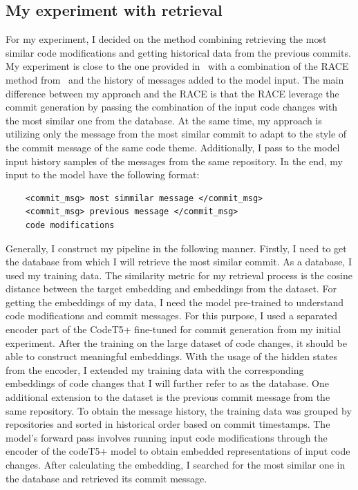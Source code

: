 \subsection{My experiment with retrieval}\label{subsec:retrieval_arch_method}
For my experiment, I decided on the method combining retrieving the most similar code modifications and getting historical data from the previous commits. My experiment is close to the one provided in~\cite{eliseeva2023commit} with a combination of the RACE method from~\cite{shi2022race} and the history of messages added to the model input. The main difference between my approach and the RACE  is that the RACE leverage the commit generation by passing the combination of the input code changes with the most similar one from the database. At the same time, my approach is utilizing only the message from the most similar commit to adapt to the style of the commit message of the same code theme.  Additionally, I pass to the model input history samples of the messages from the same repository. In the end, my input to the model have the following format:  
\begin{verbatim}
    <commit_msg> most simmilar message </commit_msg> 
    <commit_msg> previous message </commit_msg>
    code modifications 
\end{verbatim}
Generally, I construct my pipeline in the following manner. Firstly, I need to get the database from which I will retrieve the most similar commit. As a database, I used my training data. The similarity metric for my retrieval process is the cosine distance between the target embedding and embeddings from the dataset. For getting the embeddings of my data, I need the model pre-trained to understand code modifications and commit messages. For this purpose, I used a separated encoder part of the CodeT5+ fine-tuned for commit generation from my initial experiment. After the training on the large dataset of code changes, it should be able to construct meaningful embeddings. With the usage of the hidden states from the encoder, I extended my training data with the corresponding embeddings of code changes that I will further refer to as the database. One additional extension to the dataset is the previous commit message from the same repository. To obtain the message history, the training data was grouped by repositories and sorted in historical order based on commit timestamps. The model's forward pass involves running input code modifications through the encoder of the codeT5+ model to obtain embedded representations of input code changes. After calculating the embedding, I searched for the most similar one in the database and retrieved its commit message.

